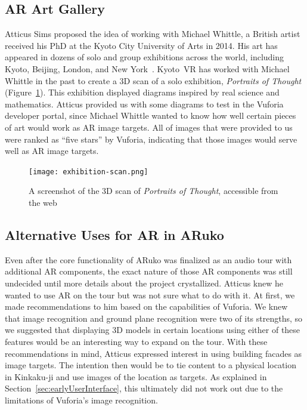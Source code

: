 \documentclass[a4paper, 10pt, american, titlepage]{article}
\begin{document}
\subsection{AR Art Gallery}
\label{sec:arArtGallery}

Atticus Sims proposed the idea of working with Michael Whittle, a British artist
received his PhD at the Kyoto City University of Arts in 2014. His art has
appeared in dozens of solo and group exhibitions across the world, including
Kyoto, Beijing, London, and New York~\autocite{michaelwhittle2019}. Kyoto~VR has
worked with Michael Whittle in the past to create a 3D scan of a solo
exhibition, \textit{Portraits of Thought} (Figure~\ref{fig:exhibitionScan}).
This exhibition displayed diagrams inspired by real science and mathematics.
Atticus provided us with some diagrams to test in the Vuforia developer portal,
since Michael Whittle wanted to know how well certain pieces of art would work
as AR image targets. All of images that were provided to us were ranked as
``five stars'' by Vuforia, indicating that those images would serve well as AR
image targets.

\begin{figure}[h]
	\centering
	\texttt{[image: exhibition-scan.png]}
    \caption{A screenshot of the 3D scan of \textit{Portraits of Thought},
    accessible from the web}
	\label{fig:exhibitionScan}
\end{figure}

\subsection{Alternative Uses for AR in ARuko}
\label{sec:alternativeARukoAR}

Even after the core functionality of ARuko was finalized as an audio tour with
additional AR components, the exact nature of those AR components was still
undecided until more details about the project crystallized. Atticus knew he
wanted to use AR on the tour but was not sure what to do with it. At first, we
made recommendations to him based on the capabilities of Vuforia. We knew that
image recognition and ground plane recognition were two of its strengths, so we
suggested that displaying 3D models in certain locations using either of these
features would be an interesting way to expand on the tour. With these
recommendations in mind, Atticus expressed interest in using building facades as
image targets. The intention then would be to tie content to a physical location
in Kinkaku-ji and use images of the location as targets. As explained in
Section~\ref{sec:earlyUserInterface}, this ultimately did not work out due to
the limitations of Vuforia's image recognition.
\end{document}
